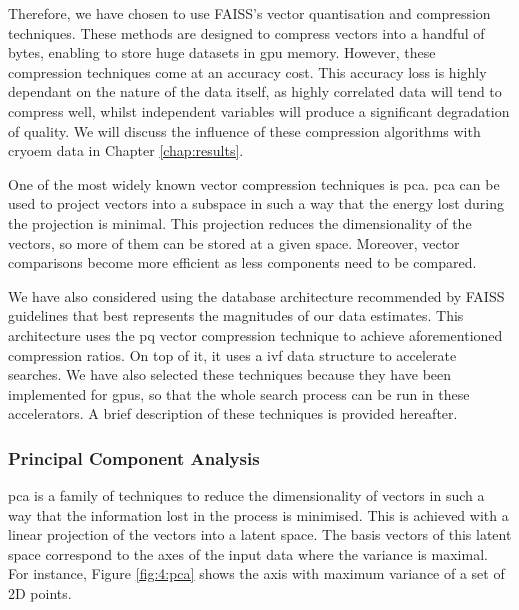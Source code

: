 \documentclass[../main.tex]{subfiles}
\begin{document}
Therefore, we have chosen to use FAISS's vector quantisation and compression techniques. These methods are designed to compress vectors into a handful of bytes, enabling to store huge datasets in \gls{gpu} memory. However, these compression techniques come at an accuracy cost. This accuracy loss is highly dependant on the nature of the data itself, as highly correlated data will tend to compress well, whilst independent variables will produce a significant degradation of quality. We will discuss the influence of these compression algorithms with \gls{cryoem} data in Chapter \ref{chap:results}.

One of the most widely known vector compression techniques is \gls{pca}. \Gls{pca} can be used to project vectors into a subspace in such a way that the energy lost during the projection is minimal. This projection reduces the dimensionality of the vectors, so more of them can be stored at a given space. Moreover, vector comparisons become more efficient as less components need to be compared.

We have also considered using the database architecture recommended by FAISS guidelines\cite{johnson2019} that best represents the magnitudes of our data estimates. This architecture uses the \gls{pq} vector compression technique to achieve aforementioned compression ratios. On top of it, it uses a \gls{ivf} data structure to accelerate searches. We have also selected these techniques because they have been implemented for \glspl{gpu}, so that the whole search process can be run in these accelerators. A brief description of these techniques is provided hereafter.

\subsubsection{Principal Component Analysis}
\Gls{pca} is a family of techniques to reduce the dimensionality of vectors in such a way that the information lost in the process is minimised\cite{shalizi2012}. This is achieved with a linear projection of the vectors into a latent space. The basis vectors of this latent space correspond to the axes of the input data where the variance is maximal. For instance, Figure \ref{fig:4:pca} shows the axis with maximum variance of a set of 2D points.
\end{document}
